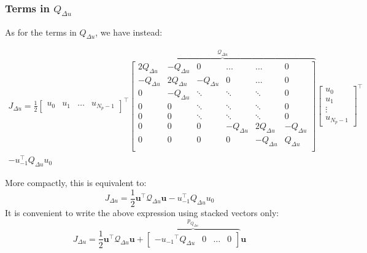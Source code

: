 \documentclass[a4paper,12pt,fleqn]{article}
\newcommand{\varuvec}{\mathbf{u}}
\newcommand{\Np}{{N_p}}
\newcommand{\baru}{u_{-1}}
\begin{document}
  \subsubsection{Terms in $Q_{\Delta u}$}
 As for the terms in $Q_{\Delta u}$, we have instead:
 \begin{small}
\begin{multline}
 J_{\Delta u} = \frac{1}{2}
 \begin{bmatrix}
  u_0 & u_1 &\dots & u_{\Np-1}
 \end{bmatrix}^\top
 \overbrace{
  \begin{bmatrix}
  2Q_{\Delta u} & -Q_{\Delta u} &0                  & \dots         & \dots  &   0\\
  -Q_{\Delta u} & 2Q_{\Delta u} &-Q_{\Delta u}      &0              & \dots  &   0\\
  0             & -Q_{\Delta u} &\ddots             & \ddots        &\ddots  &   0\\
  0             & 0             &\ddots             & \ddots        &\ddots  &   0\\  
  0             & 0             &\ddots             & \ddots        &\ddots  &   0\\
  0             & 0             &0                  &-Q_{\Delta u}  & 2Q_{\Delta u} &-Q_{\Delta u}\\  
  0             & 0             &0                  &0              & -Q_{\Delta u} &Q_{\Delta u}\\  
  \end{bmatrix}
  }^{\mathcal{Q}_{\Delta u}}
 \begin{bmatrix}
  u_0 \\  u_1\\ \vdots\\  u_{\Np-1}
 \end{bmatrix}^\top \\
-\baru^\top Q_{\Delta u}u_0
 \end{multline} 
 \end{small}
 More compactly, this is equivalent to:
\begin{equation*}
 J_{\Delta u} = \frac{1}{2} \varuvec^\top \mathcal{Q}_{\Delta u} \varuvec -\baru^\top Q_{\Delta u}u_0
\end{equation*}
 It is convenient to write the above expression using stacked vectors only:
\begin{equation}
 J_{\Delta u} = \frac{1}{2} \varuvec^\top \mathcal{Q}_{\Delta u} \varuvec +   
 \overbrace{
 \begin{bmatrix}
  -{\baru}^\top Q_{\Delta u} & 0 & \dots  & 0
 \end{bmatrix}}^{p_{Q_{\Delta u}}}
 \varuvec
\end{equation}
 
\end{document}

